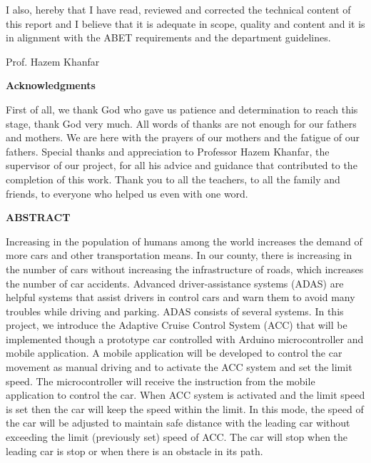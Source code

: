 \documentclass[12pt,a4paper]{report}
\begin{document}
I also, hereby that I have read, reviewed and corrected the technical content of this report and I believe that it is adequate in scope, quality and content and it is in alignment with the ABET requirements and the department guidelines.


\textcolor{bb}{Prof. Hazem Khanfar}

\newpage

 \begin{center}\textbf{Acknowledgments}\end{center}

First of all, we thank God who gave us patience and determination to reach this stage, thank God very much. All words of thanks are not enough for our fathers and mothers. We are here with the prayers of our mothers and the fatigue of our fathers. Special thanks and appreciation to Professor Hazem Khanfar, the supervisor of our project, for all his advice and guidance that contributed to the completion of this work. Thank you to all the teachers, to all the family and friends, to everyone who helped us even with one word.
 
\newpage


\begin{center}\textbf{ABSTRACT}\end{center}

Increasing in the population of humans among the world increases the demand of more cars and other transportation means. In our county, there is increasing in the number of cars without increasing the infrastructure of roads, which increases the number of car accidents. Advanced driver-assistance systems (ADAS) are helpful systems that assist drivers in control cars and warn them to avoid many troubles while driving and parking. ADAS consists of several systems. In this project, we introduce the Adaptive Cruise Control System (ACC) that will be implemented though a prototype car controlled with Arduino microcontroller and mobile application.
A mobile application will be developed to control the car movement as manual driving and to activate the ACC system and set the limit speed. The microcontroller will receive the instruction from the mobile application to control the car.  When ACC system is activated and the limit speed is set then the car will keep the speed within the limit. In this mode, the speed of the car will be adjusted to maintain safe distance with the leading car without exceeding the limit (previously set) speed of ACC. The car will stop when the leading car is stop or when there is an obstacle in its path. 
\end{document}
